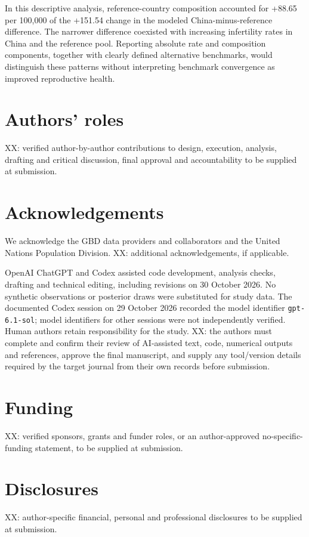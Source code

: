 \documentclass[11pt,a4paper]{article}
\begin{document}
In this descriptive analysis, reference-country composition accounted for +88.65 per 100,000 of the +151.54 change in the modeled China-minus-reference difference. The narrower difference coexisted with increasing infertility rates in China and the reference pool. Reporting absolute rate and composition components, together with clearly defined alternative benchmarks, would distinguish these patterns without interpreting benchmark convergence as improved reproductive health.

\section*{Authors' roles}
XX: verified author-by-author contributions to design, execution, analysis, drafting and critical discussion, final approval and accountability to be supplied at submission.

\section*{Acknowledgements}
We acknowledge the GBD data providers and collaborators and the United Nations Population Division. XX: additional acknowledgements, if applicable.

{\color{blue} OpenAI ChatGPT and Codex assisted code development, analysis checks, drafting and technical editing, including revisions on 30 October 2026. No synthetic observations or posterior draws were substituted for study data. The documented Codex session on 29 October 2026 recorded the model identifier \texttt{gpt-6.1-sol}; model identifiers for other sessions were not independently verified. Human authors retain responsibility for the study. XX: the authors must complete and confirm their review of AI-assisted text, code, numerical outputs and references, approve the final manuscript, and supply any tool/version details required by the target journal from their own records before submission.}

\section*{Funding}
XX: verified sponsors, grants and funder roles, or an author-approved no-specific-funding statement, to be supplied at submission.

\section*{Disclosures}
XX: author-specific financial, personal and professional disclosures to be supplied at submission.
\end{document}
